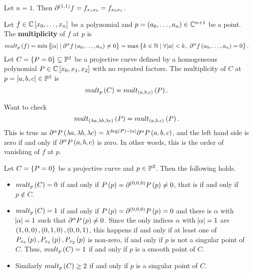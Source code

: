 \begin{example*}
Let $ n = 1 $. Then $ \partial^{\br{1, 1}} f = f_{x_1x_0} = f_{x_0x_1} $.
\end{example*}

\begin{definition}
Let $ f \in \C\sbr{x_0, \dots, x_n} $ be a polynomial and $ p = \br{a_0, \dots, a_n} \in \C^{n + 1} $ be a point. The \textbf{multiplicity} of $ f $ at $ p $ is
$$ mult_p\br{f} = \min\cbr{\abs{\alpha} \mid \partial^\alpha f\br{a_0, \dots, a_n} \ne 0} = \max\cbr{k \in \N \mid \forall \abs{\alpha} < k, \ \partial^\alpha f\br{a_0, \dots, a_n} = 0}. $$
Let $ C = \cbr{P = 0} \subseteq \P^2 $ be a projective curve defined by a homogeneous polynomial $ P \in \C\sbr{x_0, x_1, x_2} $ with no repeated factors. The multiplicity of $ C $ at $ p = \sbr{a, b, c} \in \P^2 $ is
$$ mult_p\br{C} = mult_{\br{a, b, c}}\br{P}. $$
\end{definition}

Want to check
$$ mult_{\br{\lambda a, \lambda b, \lambda c}}\br{P} = mult_{\br{a, b, c}}\br{P}. $$
This is true as $ \partial^\alpha P\br{\lambda a, \lambda b, \lambda c} = \lambda^{\deg\br{P} - \abs{\alpha}}\partial^\alpha P\br{a, b, c} $, and the left hand side is zero if and only if $ \partial^\alpha P\br{a, b, c} $ is zero. In other words, this is the order of vanishing of $ f $ at $ p $.


Let $ C = \cbr{P = 0} $ be a projective curve and $ p \in \P^2 $. Then the following holds.
\begin{itemize}
\item $ mult_p\br{C} = 0 $ if and only if $ P\br{p} = \partial^{\br{0, 0, 0}} P\br{p} \ne 0 $, that is if and only if $ p \notin C $.
\item $ mult_p\br{C} = 1 $ if and only if $ P\br{p} = \partial^{\br{0, 0, 0}} P\br{p} = 0 $ and there is $ \alpha $ with $ \abs{\alpha} = 1 $ such that $ \partial^{\alpha} P\br{p} \ne 0 $. Since the only indices $ \alpha $ with $ \abs{\alpha} = 1 $ are $ \br{1, 0, 0}, \br{0, 1, 0}, \br{0, 0, 1} $, this happens if and only if at least one of $ P_{x_0}\br{p}, P_{x_1}\br{p}, P_{x_2}\br{p} $ is non-zero, if and only if $ p $ is not a singular point of $ C $. Thus, $ mult_p\br{C} = 1 $ if and only if $ p $ is a smooth point of $ C $.
\item Similarly $ mult_p\br{C} \ge 2 $ if and only if $ p $ is a singular point of $ C $.
\end{itemize}

